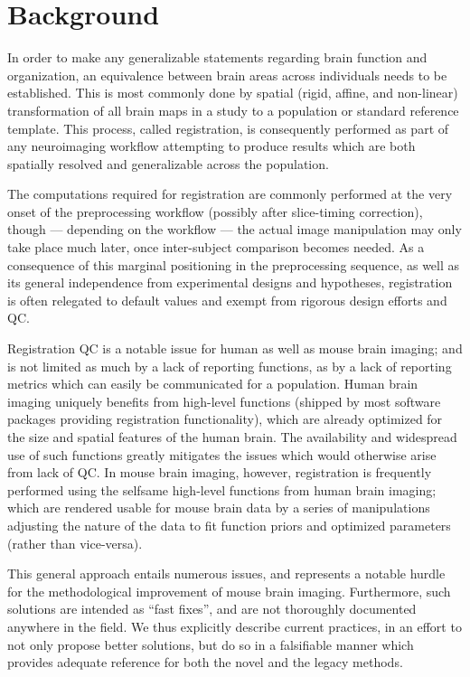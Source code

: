 \section{Background}
\label{sec:bg}

In order to make any generalizable statements regarding brain function and organization, an equivalence between brain areas across individuals needs to be established.
This is most commonly done by spatial (rigid, affine, and non-linear) transformation of all brain maps in a study to a population or standard reference template.
This process, called registration, is consequently performed as part of any neuroimaging workflow attempting to produce results which are both spatially resolved and generalizable across the population.

The computations required for registration are commonly performed at the very onset of the preprocessing workflow (possibly after slice-timing correction),
though --- depending on the workflow --- the actual image manipulation may only take place much later, once inter-subject comparison becomes needed.
As a consequence of this marginal positioning in the preprocessing sequence, as well as its general independence from experimental designs and hypotheses, registration is often relegated to default values and exempt from rigorous design efforts and QC.

Registration QC is a notable issue for human as well as mouse brain imaging;
and is not limited as much by a lack of reporting functions, as by a lack of reporting metrics which can easily be communicated for a population.
Human brain imaging uniquely benefits from high-level functions (shipped by most software packages providing registration functionality), which are already optimized for the size and spatial features of the human brain.
The availability and widespread use of such functions greatly mitigates the issues which would otherwise arise from lack of QC.
In mouse brain imaging, however, registration is frequently performed using the selfsame high-level functions from human brain imaging; which are rendered usable for mouse brain data by a series of manipulations adjusting the nature of the data to fit function priors and optimized parameters (rather than vice-versa).

This general approach entails numerous issues, and represents a notable hurdle for the methodological improvement of mouse brain imaging.
Furthermore, such solutions are intended as “fast fixes”, and are not thoroughly documented anywhere in the field.
We thus explicitly describe current practices, in an effort to not only propose better solutions, but do so in a falsifiable manner which provides adequate reference for both the novel and the legacy methods.

